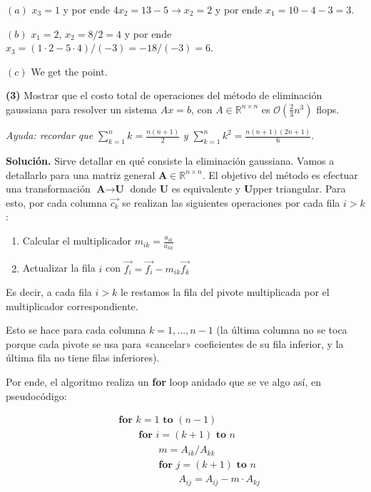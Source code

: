 \documentclass[12pt]{article}
\begin{document}
$(a)$ $x_3 = 1$ y por ende $4x_2 = 13 - 5 \to x_2 = 2$ y por ende 
$x_1 = 10 - 4 - 3 = 3$.

$(b)$ $x_1 = 2$, $x_2 = 8 / 2 = 4$ y por ende $x_3 = ( 1 \cdot 2 - 5 \cdot 4 ) /
(-3) = -18 / (-3) = 6$.

$(c)$ We get the point. 

\pagebreak 

\begin{myframe}
    \textbf{(3)} Mostrar que el costo total de operaciones del método de eliminación gaussiana para resolver un sistema $Ax = b$, con $A \in \mathbb{R}^{n \times n}$ es $\mathcal{O}\left(\frac{2}{3}n^3\right)$ flops.

\textit{Ayuda: recordar que} $\sum_{k=1}^{n} k = \frac{n(n+1)}{2}$ \textit{y} $\sum_{k=1}^{n} k^2 = \frac{n(n+1)(2n+1)}{6}$.
\end{myframe}

\textbf{Solución.} Sirve detallar en qué consiste la eliminación gaussiana.
Vamos a detallarlo para una matriz general $\textbf{A} \in \mathbb{R}^{n\times
n}$. El objetivo del método es efectuar una transformación $\textbf{A} \to
\textbf{U}$ donde $\textbf{U}$ es equivalente y \textbf{U}pper triangular. 
Para esto, por cada columna $\overrightarrow{c_k}$ se realizan las siguientes
operaciones por cada fila $i > k$:

\begin{enumerate}
    \item Calcular el multiplicador $m_{ik} = \frac{a_{ik}}{a_{kk}}$
    \item Actualizar la fila $i$ con $\overrightarrow{f_i} =
        \overrightarrow{f_i} - m_{ik} \overrightarrow{f_k}$
\end{enumerate}

Es decir, a cada fila $i > k$ le restamos la fila del pivote multiplicada por el
multiplicador correspondiente.

Esto se hace para cada columna $k = 1, \ldots, n-1$ (la última columna no se
toca porque cada pivote se usa para «cancelar» coeficientes de su fila inferior,
y la última fila no tiene filas inferiores).

Por ende, el algoritmo realiza un \textbf{for} loop anidado que se ve algo así,
en pseudocódigo:

\begin{align*}
&\textbf{for } k = 1 \textbf{ to } ( n - 1 )\\
&\qquad \textbf{for } i = (k+1) \textbf{ to } n \\ 
&\qquad \qquad m = A_{ik} / A_{kk}\\ 
&\qquad\qquad \textbf{for } j = (k+1) \textbf{ to } n \\ 
&\qquad \qquad \qquad A_{ij} = A_{ij} - m \cdot A_{kj}
\end{align*}
\end{document}
